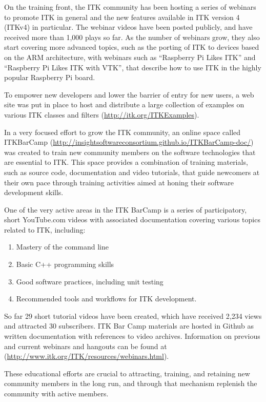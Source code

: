 \documentclass{frontiersENG} %
\begin{document}
On the training front, the ITK community has been hosting a series of webinars
to promote ITK in general and the new features available in ITK version 4
(ITKv4) in particular. The webinar videos have been posted publicly, and have
received more than 1,000 plays so far. As the number of webinars grow, they
also start covering more advanced topics, such as the porting of ITK to
devices based on the ARM architecture, with webinars such as ``Raspberry Pi
Likes ITK'' and ``Raspberry Pi Likes ITK with VTK'', that describe how to use
ITK in the highly popular Raspberry Pi board.

To empower new developers and lower the barrier of entry for new users, a web
site was put in place to host and distribute a large collection of examples on
various ITK classes and filters (\url{http://itk.org/ITKExamples}).

In a very focused effort to grow the ITK community, an online space called
ITKBarCamp (\url{http://insightsoftwareconsortium.github.io/ITKBarCamp-doc/})
was created to train new community members on the software technologies that
are essential to ITK. This space provides a combination of training materials,
such as source code, documentation and video tutorials, that guide newcomers at
their own pace through training activities aimed at honing their software
development skills.

One of the very active areas in the ITK BarCamp is a series of participatory,
short YouTube.com videos with associated documentation covering various topics
related to ITK, including:

\begin{enumerate}
\item Mastery of the command line
\item Basic C++ programming skills
\item Good software practices, including unit testing
\item Recommended tools and workflows for ITK development.
\end{enumerate}

So far 29 short tutorial videos have been created, which have received 2,234
views and attracted 30 subscribers. ITK Bar Camp materials are hosted in Github
as written documentation with references to video archives. Information on
previous and current webinars and hangouts can be found at
(\url{http://www.itk.org/ITK/resources/webinars.html}).

These educational efforts are crucial to attracting, training, and retaining
new community members in the long run, and through that mechanism replenish the
community with active members.
\end{document}
